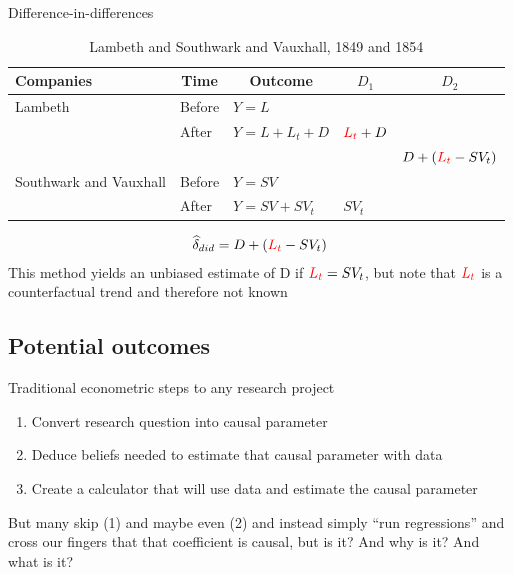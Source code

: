 \documentclass{beamer}
\begin{document}
\begin{frame}{Difference-in-differences}

\begin{table}\centering
\scriptsize
		\caption{Lambeth and Southwark and Vauxhall, 1849 and 1854}
		\begin{center}
		\begin{tabular}{lll|lc}
		\toprule
		\multicolumn{1}{l}{\textbf{Companies}}&
		\multicolumn{1}{c}{\textbf{Time}}&
		\multicolumn{1}{c}{\textbf{Outcome}}&
		\multicolumn{1}{c}{$D_1$}&
		\multicolumn{1}{c}{$D_2$}\\
		\midrule
		Lambeth & Before & $Y=L$ \\
		& After & $Y=L + L_t + D$ & $\textcolor{red}{L_t}+D$\\
		\midrule
		& & & & $D + (\textcolor{red}{L_t}- SV_t)$ \\
		\midrule
		Southwark and Vauxhall & Before & $Y=SV$ \\
		& After & $Y=SV + SV_t$ & $SV_t$\\
		\bottomrule
		\end{tabular}
		\end{center}
	\end{table}

\begin{eqnarray*}
\widehat{\delta}_{did} = D + (\textcolor{red}{L_t}- SV_t)
\end{eqnarray*}This method yields an unbiased estimate of D if $\textcolor{red}{L_t} = SV_t$, but note that $\textcolor{red}{L_t}$ is a counterfactual trend and therefore not known

\end{frame}







\subsection{Potential outcomes}


\begin{frame}{Traditional econometric steps to any research project}

\begin{enumerate}
\item Convert research question into causal parameter
\item Deduce beliefs needed to estimate that causal parameter with data
\item Create a calculator that will use data and estimate the causal parameter
\end{enumerate}

\bigskip

But many skip (1) and maybe even (2) and instead simply ``run regressions'' and cross our fingers that that coefficient is causal, but is it? And why is it?  And what is it? 

\end{frame}
\end{document}

